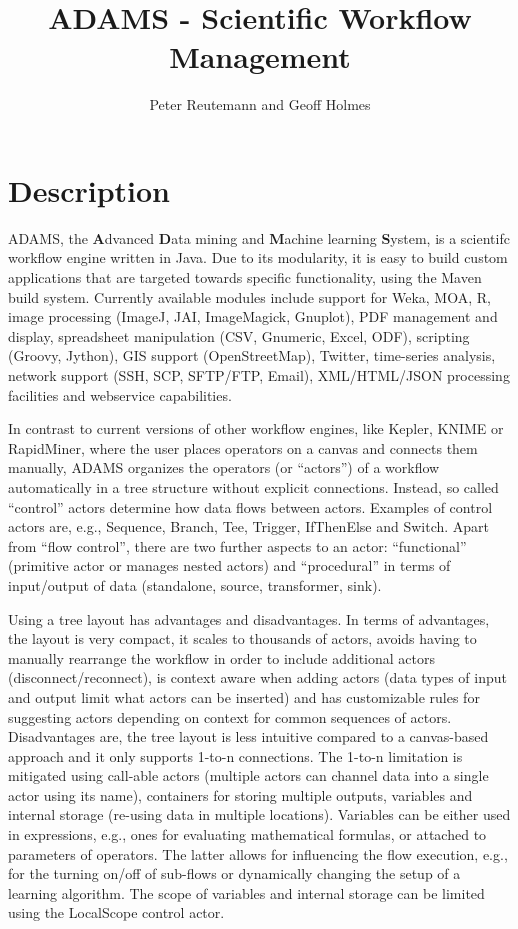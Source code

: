 \documentclass[a4paper,10pt]{article}
\title{ADAMS - Scientific Workflow Management}
\author{Peter Reutemann and Geoff Holmes}
\begin{document}
\maketitle

\section{Description}
ADAMS, the \textbf{A}dvanced \textbf{D}ata mining and \textbf{M}achine learning \textbf{S}ystem, is a scientifc workflow engine written in Java. Due to its modularity, it is easy to build custom applications that are targeted towards specific functionality, using the Maven build system. Currently available modules include support for Weka, MOA, R, image processing (ImageJ, JAI, ImageMagick, Gnuplot), PDF management and display, spreadsheet manipulation (CSV, Gnumeric, Excel, ODF), scripting (Groovy, Jython), GIS support (OpenStreetMap), Twitter, time-series analysis, network support (SSH, SCP, SFTP/FTP, Email), XML/HTML/JSON processing facilities and webservice capabilities.

In contrast to current versions of other workflow engines, like Kepler, KNIME or RapidMiner, where the user places operators on a canvas and connects them manually, ADAMS organizes the operators (or ``actors'') of a workflow automatically in a tree structure without explicit connections. Instead, so called ``control'' actors determine how data flows between actors. Examples of control actors are, e.g., Sequence, Branch, Tee, Trigger, IfThenElse and Switch. Apart from ``flow control'', there are two further aspects to an actor: ``functional'' (primitive actor or manages nested actors) and ``procedural'' in terms of input/output of data (standalone, source, transformer, sink).

Using a tree layout has advantages and disadvantages. In terms of advantages, the layout is very compact, it scales to thousands of actors, avoids having to manually rearrange the workflow in order to include additional actors (disconnect/reconnect), is context aware when adding actors (data types of input and output limit what actors can be inserted) and has customizable rules for suggesting actors depending on context for common sequences of actors. Disadvantages are, the tree layout is less intuitive compared to a canvas-based approach and it only supports 1-to-n connections. The 1-to-n limitation is mitigated using call-able actors (multiple actors can channel data into a single actor using its name), containers for storing multiple outputs, variables and internal storage (re-using data in multiple locations). Variables can be either used in expressions, e.g., ones for evaluating mathematical formulas, or attached to parameters of operators. The latter allows for influencing the flow execution, e.g., for 
the turning on/off of sub-flows or dynamically changing the setup of a learning algorithm. The scope of variables and internal storage can be limited using the LocalScope control actor.
\end{document}
